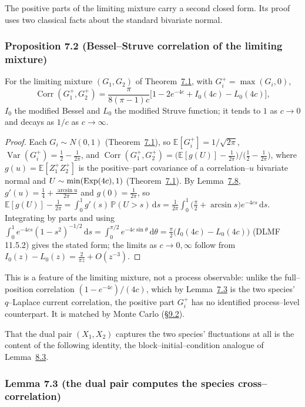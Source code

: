 \documentclass[11pt]{article}
\theoremstyle{plain}
\theoremstyle{definition}
\theoremstyle{remark}
\DeclareMathOperator{\Var}{Var}\DeclareMathOperator{\Cov}{Cov}
\DeclareMathOperator{\Corr}{Corr}\DeclareMathOperator{\cum}{cum}
\newcommand{\E}{\mathbb{E}}\newcommand{\PP}{\mathbb{P}}\newcommand{\dd}{\,\mathrm{d}}
\begin{document}
The positive parts of the limiting mixture carry a second closed form. Its proof
uses two classical facts about the standard bivariate normal.

\subsubsection{Proposition 7.2 (Bessel--Struve correlation of the limiting mixture)}\label{prop_struve}

For the limiting mixture $(G_1,G_2)$ of Theorem~\hyperref[thm_cross]{7.1}, with $G_i^+=\max(G_i,0)$,
\[
  \Corr(G_1^+,G_2^+)=\frac{\pi}{8(\pi-1)c}\big[1-2e^{-4c}+I_0(4c)-L_0(4c)\big],
\]
$I_0$ the modified Bessel and $L_0$ the modified Struve function; it tends to $1$ as
$c\to0$ and decays as $1/c$ as $c\to\infty$.
\par
\begin{proof}
Each $G_i\sim N(0,1)$ (Theorem~\hyperref[thm_cross]{7.1}), so $\E[G_i^+]=1/\sqrt{2\pi}$,
$\Var(G_i^+)=\tfrac12-\tfrac1{2\pi}$, and
$\Corr(G_1^+,G_2^+)=\big(\E[g(U)]-\tfrac1{2\pi}\big)\big/\big(\tfrac12-\tfrac1{2\pi}\big)$,
where $g(u)=\E[Z_1^+Z_2^+]$ is the positive--part covariance of a correlation--$u$
bivariate normal and $U\sim\min(\mathrm{Exp}(4c),1)$ (Theorem~\hyperref[thm_cross]{7.1}). By
Lemma~\hyperref[lem_price]{7.8}, $g'(u)=\tfrac14+\tfrac{\arcsin u}{2\pi}$ and $g(0)=\tfrac1{2\pi}$,
so $\E[g(U)]-\tfrac1{2\pi}=\int_0^1 g'(s)\,\PP(U>s)\dd s
=\tfrac1{2\pi}\int_0^1\big(\tfrac\pi2+\arcsin s\big)e^{-4cs}\dd s$. Integrating by parts and
using $\int_0^1 e^{-4cs}(1-s^2)^{-1/2}\dd s=\int_0^{\pi/2}e^{-4c\sin\theta}\dd\theta
=\tfrac\pi2\big(I_0(4c)-L_0(4c)\big)$ (DLMF 11.5.2) gives the stated form; the limits as
$c\to0,\infty$ follow from $I_0(z)-L_0(z)=\tfrac2{\pi z}+O(z^{-3})$.
\end{proof}

This is a feature of the limiting mixture, not a process observable: unlike the
full--position correlation $(1-e^{-4c})/(4c)$, which by Lemma~\hyperref[lem_crossbridge]{7.3} is the
two species' $q$--Laplace current correlation, the positive part $G_i^+$ has no
identified process--level counterpart. It is matched by Monte Carlo (\S\hyperref[sec_numerics]{9.2}).

That the dual pair $(X_1,X_2)$ captures the two species' fluctuations at all is the
content of the following identity, the block--initial--condition analogue of
Lemma~\hyperref[lem_tridual]{8.3}.

\subsubsection{Lemma 7.3 (the dual pair computes the species cross--correlation)}\label{lem_crossbridge}
\end{document}
